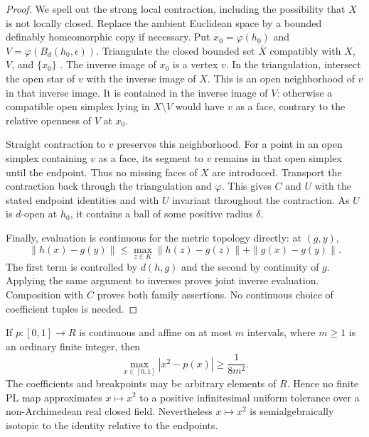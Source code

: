 \begin{proof}
We spell out the strong local contraction, including the possibility
that $X$ is not locally closed.  Replace the ambient Euclidean
space by a bounded definably homeomorphic copy if necessary.
Put $x_0=\varphi(h_0)$ and
$V=\varphi(B_d(h_0,\epsilon))$.  Triangulate the closed bounded
set $\overline X$ compatibly with $X$, $V$, and $\{x_0\}$
\cite[Theorem~4.4, pp.~42--44]{Coste1999}.  The inverse image of
$x_0$ is a vertex $v$.  In the triangulation, intersect the open
star of $v$ with the inverse image of $X$.  This is an open
neighborhood of $v$ in that inverse image.  It is contained in the
inverse image of $V$: otherwise a compatible open simplex lying
in $X\setminus V$ would have $v$ as a face, contrary to the
relative openness of $V$ at $x_0$.

Straight contraction to $v$ preserves this neighborhood.  For a
point in an open simplex containing $v$ as a face, its segment to
$v$ remains in that open simplex until the endpoint.  Thus no
missing faces of $X$ are introduced.  Transport the contraction
back through the triangulation and $\varphi$.  This gives $C$ and
$U$ with the stated endpoint identities and with $U$ invariant
throughout the contraction.  As $U$ is $d$-open at $h_0$, it contains
a ball of some positive radius $\delta$.

Finally, evaluation is continuous for the metric topology directly:
at $(g,y)$,
\[
 \|h(x)-g(y)\|
 \leq\max_{z\in K}\|h(z)-g(z)\|+\|g(x)-g(y)\|.
\]
The first term is controlled by $d(h,g)$ and the second by
continuity of $g$.  Applying the same argument to inverses proves
joint inverse evaluation.  Composition with $C$ proves both
family assertions.  No continuous choice of coefficient tuples
is needed.
\end{proof}

\begin{proposition}\label{prop:infinitesimal-pl-approximation-obstruction}
If $p:[0,1]\to R$ is continuous and affine on at most $m$ intervals,
where $m\geq1$ is an ordinary finite integer, then
\begin{equation}\label{eq:finite-piece-quadratic-lower-bound}
 \max_{x\in[0,1]}|x^2-p(x)|\geq\frac{1}{8m^2}.
\end{equation}
The coefficients and breakpoints may be arbitrary elements of $R$.
Hence no finite PL map approximates $x\mapsto x^2$ to a positive
infinitesimal uniform tolerance over a non-Archimedean real closed
field.  Nevertheless $x\mapsto x^2$ is semialgebraically isotopic
to the identity relative to the endpoints.
\end{proposition}

